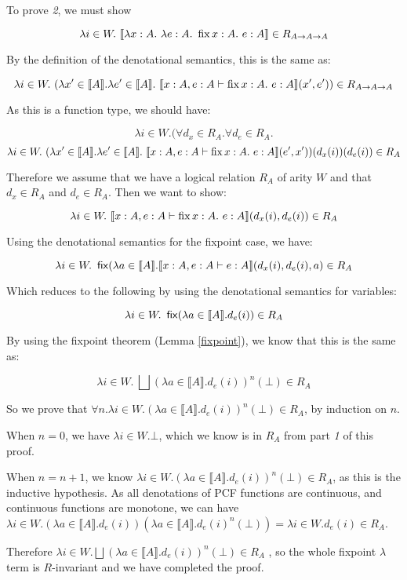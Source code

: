 To prove \emph{2}, we must show 

\[ \lambda i \in W. \ \llbracket \lambda x : A. \ \lambda e : A. \ \operatorname{fix} x : A. \ e : A \rrbracket \in R_{A \to A \to A} \]

By the definition of the denotational semantics, this is the same as:

\[ \lambda i \in W. \ (\lambda x' \in \llbracket A \rrbracket. \lambda e' \in \llbracket A \rrbracket. \ \llbracket x:A, e :A \vdash \fix x : A. \ e : A \rrbracket (x',e')) \in R_{A \to A \to A} \]

As this is a function type, we should have:

\[ \lambda i \in W. (\forall d_x \in R_A. \forall d_e \in R_A. \]
\[ \lambda i \in W. \ (\lambda x' \in \llbracket A \rrbracket. \lambda e' \in \llbracket A \rrbracket. \ \llbracket x:A, e :A \vdash \fix x : A. \ e : A \rrbracket (e',x'))(d_x(i))(d_e(i)) \in R_A \]

Therefore we assume that we have a logical relation $R_A$ of arity $W$ and that $d_x \in R_A$ and $d_e \in R_A$. Then we want to show:

\[ \lambda i \in W. \  \llbracket x:A, e :A \vdash \operatorname{fix} x : A. \ e : A \rrbracket (d_x(i),d_e(i)) \in R_A \]

Using the denotational semantics for the fixpoint case, we have:

\[ \lambda i \in W. \  \operatorname{\mathsf{fix}} (\lambda a \in \llbracket A \rrbracket. \llbracket x:A, e :A \vdash  e : A \rrbracket (d_x(i),d_e(i),a) \in R_A \]

Which reduces to the following by using the denotational semantics for variables:

\[ \lambda i \in W. \  \operatorname{\mathsf{fix}} (\lambda a \in \llbracket A \rrbracket . d_e(i)) \in R_A \]

By using the fixpoint theorem (Lemma \ref{fixpoint}), we know that this is the same as:

\[ \lambda i \in W. \ \bigsqcup (\lambda a \in \llbracket A \rrbracket . d_e(i))^n(\bot) \in R_A \]


So we prove that $\forall n. \lambda i \in W. (\lambda a \in \llbracket A \rrbracket . d_e(i))^n(\bot) \in R_A$, by induction on $n$.

When $n = 0$, we have $\lambda i \in W. \bot$, which we know is in $R_A$ from part \emph{1} of this proof.

When $n = n+1$, we know $\lambda i \in W. (\lambda a \in \llbracket A \rrbracket . d_e(i))^n(\bot) \in R_A$, as this is the inductive hypothesis. As all denotations of PCF functions are continuous, and continuous functions are monotone, we can have $\lambda i \in W. (\lambda a \in \llbracket A \rrbracket . d_e(i)) (\lambda a \in \llbracket A \rrbracket . d_e(i)^n(\bot)) = \lambda i \in W.  d_e(i) \in R_A$.

Therefore $\lambda i \in W. \bigsqcup (\lambda a \in \llbracket A \rrbracket . d_e(i))^n(\bot) \in R_A$ , so the whole fixpoint $\lambda$ term is $R$-invariant and we have completed the proof. 